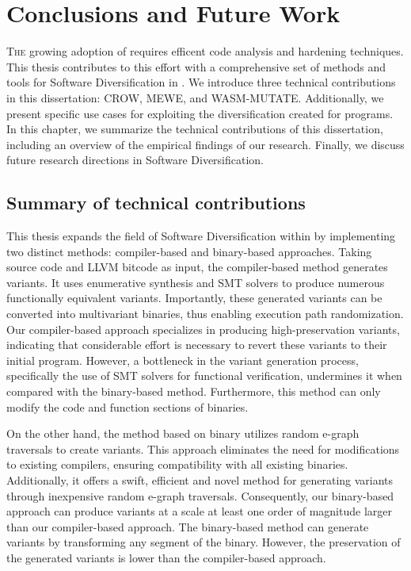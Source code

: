 
\chapter{Conclusions and Future Work}
\label{results}


\lettrine[lines=3]{T}{he} growing adoption of \Wasm requires efficent code analysis and hardening techniques.
This thesis contributes to this effort with a comprehensive set of methods and tools for Software Diversification in \Wasm.
We introduce three technical contributions in this dissertation: CROW, MEWE, and WASM-MUTATE.
Additionally, we present specific use cases for exploiting the diversification created for \Wasm programs.
In this chapter, we summarize the technical contributions of this dissertation, including an overview of the empirical findings of our research.
Finally, we discuss future research directions in \Wasm Software Diversification.

\section{Summary of technical contributions}



This thesis expands the field of Software Diversification within \Wasm by implementing two distinct methods: compiler-based and binary-based approaches. 
Taking source code and LLVM bitcode as input, the compiler-based method generates \Wasm variants.
It uses enumerative synthesis and SMT solvers to produce numerous functionally equivalent variants. 
Importantly, these generated variants can be converted into multivariant binaries, thus enabling execution path randomization. 
Our compiler-based approach specializes in producing high-preservation variants, indicating that considerable effort is necessary to revert these variants to their initial program. 
However, a bottleneck in the variant generation process, specifically the use of SMT solvers for functional verification, undermines it when compared with the binary-based method. 
Furthermore, this method can only modify the code and function sections of \Wasm binaries.

On the other hand, the method based on binary utilizes random e-graph traversals to create variants. 
This approach eliminates the need for modifications to existing compilers, ensuring compatibility with all existing \Wasm binaries. 
Additionally, it offers a swift, efficient and novel method for generating variants through inexpensive random e-graph traversals. 
Consequently, our binary-based approach can produce variants at a scale at least one order of magnitude larger than our compiler-based approach. 
The binary-based method can generate variants by transforming any segment of the \wasm binary.
However, the preservation of the generated variants is lower than the compiler-based approach.


